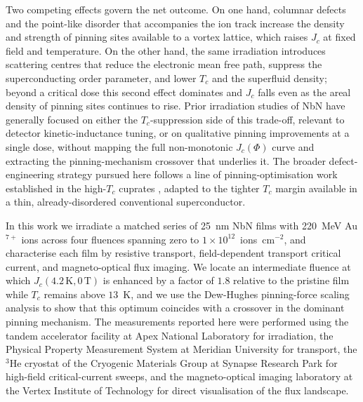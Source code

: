 Two competing effects govern the net outcome. On one hand, columnar defects and the point-like disorder that accompanies the ion track increase the density and strength of pinning sites available to a vortex lattice, which raises $J_c$ at fixed field and temperature. On the other hand, the same irradiation introduces scattering centres that reduce the electronic mean free path, suppress the superconducting order parameter, and lower $T_c$ and the superfluid density; beyond a critical dose this second effect dominates and $J_c$ falls even as the areal density of pinning sites continues to rise. Prior irradiation studies of NbN have generally focused on either the $T_c$-suppression side of this trade-off, relevant to detector kinetic-inductance tuning, or on qualitative pinning improvements at a single dose, without mapping the full non-monotonic $J_c(\Phi)$ curve and extracting the pinning-mechanism crossover that underlies it. The broader defect-engineering strategy pursued here follows a line of pinning-optimisation work established in the high-$T_c$ cuprates \cite{larbalestier2001,gurevich2011}, adapted to the tighter $T_c$ margin available in a thin, already-disordered conventional superconductor.

In this work we irradiate a matched series of 25~nm NbN films with 220~MeV Au$^{7+}$ ions across four fluences spanning zero to $1\times10^{12}$~ions~cm$^{-2}$, and characterise each film by resistive transport, field-dependent transport critical current, and magneto-optical flux imaging. We locate an intermediate fluence at which $J_c(4.2\,\mathrm{K},0\,\mathrm{T})$ is enhanced by a factor of $1.8$ relative to the pristine film while $T_c$ remains above $13$~K, and we use the Dew-Hughes pinning-force scaling analysis to show that this optimum coincides with a crossover in the dominant pinning mechanism. The measurements reported here were performed using the tandem accelerator facility at Apex National Laboratory for irradiation, the Physical Property Measurement System at Meridian University for transport, the $^3$He cryostat of the Cryogenic Materials Group at Synapse Research Park for high-field critical-current sweeps, and the magneto-optical imaging laboratory at the Vertex Institute of Technology for direct visualisation of the flux landscape.

